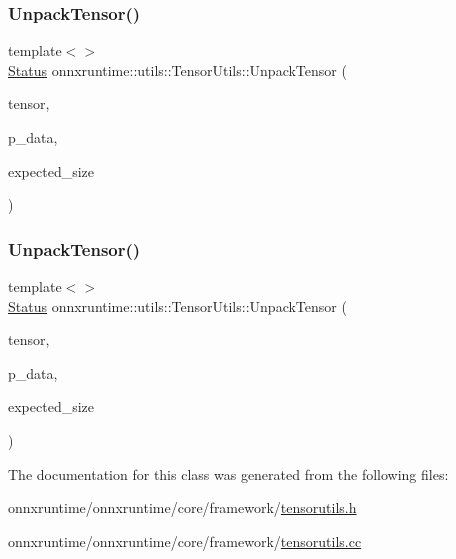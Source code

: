 \mbox{\label{classonnxruntime_1_1utils_1_1TensorUtils_aa9ccd0bd8be029bc52c4778ecb2e533c}} 
\subsubsection{\texorpdfstring{Unpack\+Tensor()}{UnpackTensor()}\hspace{0.1cm}{\footnotesize\ttfamily [3/4]}}
{\footnotesize\ttfamily template$<$$>$ \\
\mbox{\hyperlink{classonnxruntime_1_1common_1_1Status}{Status}} onnxruntime\+::utils\+::\+Tensor\+Utils\+::\+Unpack\+Tensor (\begin{DoxyParamCaption}\item[{const O\+N\+N\+X\+\_\+\+N\+A\+M\+E\+S\+P\+A\+C\+E\+::\+Tensor\+Proto \&}]{tensor,  }\item[{bool $\ast$}]{p\+\_\+data,  }\item[{int64\+\_\+t}]{expected\+\_\+size }\end{DoxyParamCaption})}

\mbox{\label{classonnxruntime_1_1utils_1_1TensorUtils_a3466d3aa84eca1738527b3d2c66ab7ae}} 
\subsubsection{\texorpdfstring{Unpack\+Tensor()}{UnpackTensor()}\hspace{0.1cm}{\footnotesize\ttfamily [4/4]}}
{\footnotesize\ttfamily template$<$$>$ \\
\mbox{\hyperlink{classonnxruntime_1_1common_1_1Status}{Status}} onnxruntime\+::utils\+::\+Tensor\+Utils\+::\+Unpack\+Tensor (\begin{DoxyParamCaption}\item[{const O\+N\+N\+X\+\_\+\+N\+A\+M\+E\+S\+P\+A\+C\+E\+::\+Tensor\+Proto \&}]{tensor,  }\item[{\mbox{\hyperlink{uniononnxruntime_1_1MLFloat16}{M\+L\+Float16}} $\ast$}]{p\+\_\+data,  }\item[{int64\+\_\+t}]{expected\+\_\+size }\end{DoxyParamCaption})}



The documentation for this class was generated from the following files\+:\begin{DoxyCompactItemize}
\item 
onnxruntime/onnxruntime/core/framework/\mbox{\hyperlink{tensorutils_8h}{tensorutils.\+h}}\item 
onnxruntime/onnxruntime/core/framework/\mbox{\hyperlink{tensorutils_8cc}{tensorutils.\+cc}}\end{DoxyCompactItemize}
